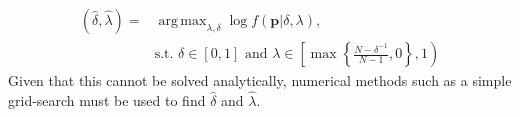 \documentclass[11pt]{article}
\DeclareMathOperator*{\argmax}{arg\,max}
\theoremstyle{definition}
\theoremstyle{definition}
\begin{document}
\begin{align*}
\left(\hat{\delta}, \hat{\lambda}\right) =& \argmax_{\lambda, \delta} \log  f\left(\boldsymbol{p}| \delta, \lambda \right),\\
& \text{s.t. } \nonumber \delta \in [0,1] \text{ and } \lambda \in \left[  \max \left\{ \frac{N-\delta^{-1}}{N-1}, 0\right\}, 1 \right)
\end{align*}
Given that this cannot be solved analytically, numerical methods such as a simple grid-search must be used to find $\hat{\delta}$ and $\hat{\lambda}$. 

 


%
\end{document}
